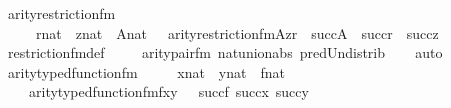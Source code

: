 \begin{isabellebody}
\isanewline
%
\endisadelimproof
\isanewline
{}\isamarkupfalse%
\ arity{\isacharunderscore}{\kern0pt}restriction{\isacharunderscore}{\kern0pt}fm\ {\isacharcolon}{\kern0pt}\ \isanewline
\ \ \ \ {\isachardoublequoteopen}{\isasymlbrakk}\ r{\isasymin}nat\ {\isacharsemicolon}{\kern0pt}\ z{\isasymin}nat\ {\isacharsemicolon}{\kern0pt}\ A{\isasymin}nat\ {\isasymrbrakk}\ {\isasymLongrightarrow}\ arity{\isacharparenleft}{\kern0pt}restriction{\isacharunderscore}{\kern0pt}fm{\isacharparenleft}{\kern0pt}A{\isacharcomma}{\kern0pt}z{\isacharcomma}{\kern0pt}r{\isacharparenright}{\kern0pt}{\isacharparenright}{\kern0pt}\ {\isacharequal}{\kern0pt}\ succ{\isacharparenleft}{\kern0pt}A{\isacharparenright}{\kern0pt}\ {\isasymunion}\ succ{\isacharparenleft}{\kern0pt}r{\isacharparenright}{\kern0pt}\ {\isasymunion}\ succ{\isacharparenleft}{\kern0pt}z{\isacharparenright}{\kern0pt}{\isachardoublequoteclose}\isanewline
%
\isadelimproof
\ \ %
\endisadelimproof
%
\isatagproof
{}\isamarkupfalse%
\ restriction{\isacharunderscore}{\kern0pt}fm{\isacharunderscore}{\kern0pt}def\ \isanewline
\ \ \isamarkupfalse%
\ arity{\isacharunderscore}{\kern0pt}pair{\isacharunderscore}{\kern0pt}fm\ nat{\isacharunderscore}{\kern0pt}union{\isacharunderscore}{\kern0pt}abs{}\ pred{\isacharunderscore}{\kern0pt}Un{\isacharunderscore}{\kern0pt}distrib\isanewline
\ \ \isamarkupfalse%
\ auto%
\endisatagproof
{\isafoldproof}%
%
\isadelimproof
\isanewline
%
\endisadelimproof
\isanewline
{}\isamarkupfalse%
\ arity{\isacharunderscore}{\kern0pt}typed{\isacharunderscore}{\kern0pt}function{\isacharunderscore}{\kern0pt}fm\ {\isacharcolon}{\kern0pt}\ \isanewline
\ \ {\isachardoublequoteopen}{\isasymlbrakk}\ x{\isasymin}nat\ {\isacharsemicolon}{\kern0pt}\ y{\isasymin}nat\ {\isacharsemicolon}{\kern0pt}\ f{\isasymin}nat\ {\isasymrbrakk}\ {\isasymLongrightarrow}\ \isanewline
\ \ \ \ arity{\isacharparenleft}{\kern0pt}typed{\isacharunderscore}{\kern0pt}function{\isacharunderscore}{\kern0pt}fm{\isacharparenleft}{\kern0pt}f{\isacharcomma}{\kern0pt}x{\isacharcomma}{\kern0pt}y{\isacharparenright}{\kern0pt}{\isacharparenright}{\kern0pt}\ {\isacharequal}{\kern0pt}\ {\isasymUnion}\ {\isacharbraceleft}{\kern0pt}succ{\isacharparenleft}{\kern0pt}f{\isacharparenright}{\kern0pt}{\isacharcomma}{\kern0pt}\ succ{\isacharparenleft}{\kern0pt}x{\isacharparenright}{\kern0pt}{\isacharcomma}{\kern0pt}\ succ{\isacharparenleft}{\kern0pt}y{\isacharparenright}{\kern0pt}{\isacharbraceright}{\kern0pt}{\isachardoublequoteclose}\isanewline
%
\isadelimproof
\ \ %

\end{isabellebody}
